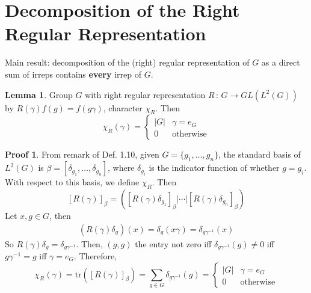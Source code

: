 \documentclass{book}
\newcommand{\define}[1]{\textbf{#1}}
\newcommand{\abs}[1]{\lvert #1 \rvert }
\newcommand{\tr}[1]{\textrm{tr}( #1 )}
\theoremstyle{definition}
\newtheorem{lemma}{Lemma}[chapter]
\theoremstyle{remarkstyle}
\newtheorem*{myproof}{Proof}%
\begin{document}
\section{Decomposition of the Right Regular Representation}
Main result: decomposition of the (right) regular representation of $G$ as a direct sum of irreps contains \define{every} irrep of $G$. \newline

\begin{lemma}
    Group $G$ with right regular representation $R\,:\,G\rightarrow GL(L^2(G))$ by $R(\gamma)f(g)=f(g\gamma)$, character $\chi_R$. Then 
    $$
    \chi_R(\gamma) = \left\{
    \begin{array}{ll}
        \abs{G} & \gamma = e_G  \\
        0 & \textrm{otherwise}
    \end{array}
    \right.
    $$
\end{lemma}
\begin{myproof}
    From remark of Def. 1.10, given $G=\{g_1,\dots,g_n\}$, the standard basis of $L^2(G)$ is $\beta=[\delta_{g_1},\dots,\delta_{g_n}] $, where $\delta_{g_i} $ is the indicator function of whether $g=g_i$. With respect to this basis, we define $\chi_R$. Then 
    $$
    [R(\gamma)]_\beta = \left([R(\gamma)\delta_{g_1}]_\beta \Big\vert \cdots \Big\vert [R(\gamma)\delta_{g_n}]_\beta \right)
    $$
    Let $x,g\in G$, then 
    \begin{align*}
        (R(\gamma)\delta_g)(x)=\delta_g(x\gamma)=\delta_{g\gamma^{-1}}(x) 
    \end{align*}
    So $R(\gamma)\delta_g=\delta_{g\gamma^{-1}} $. Then, $(g,g)$ the entry not zero iff $\delta_{g\gamma^{-1}}(g) \neq 0 $ iff $g\gamma^{-1} = g $ iff $\gamma=e_G$. Therefore,
    $$
    \chi_R(\gamma) = \tr{[R(\gamma)]_\beta} = \sum_{g\in G}\delta_{g\gamma^{-1}}(g) = \left\{
    \begin{array}{ll}
        \abs{G} & \gamma = e_G  \\
        0 & \textrm{otherwise}
    \end{array}
    \right.
    $$
    \newline
\end{myproof}
\end{document}
